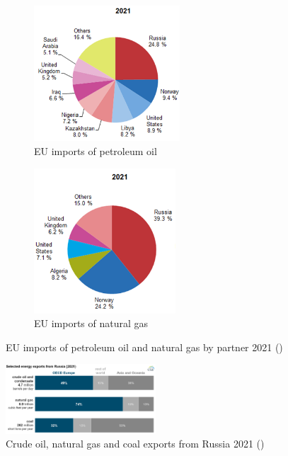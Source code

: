 \documentclass[12pt]{article}
\begin{document}
\begin{figure}[h]
     \centering
     \begin{subfigure}[b]{0.45\textwidth}
         \centering
         \includegraphics[width=0.60\textwidth]{images/eu oil import 21.png}
         \caption{EU imports of petroleum oil}
         \label{fig:eu oil import 21}
     \end{subfigure}
     \hfill
     \begin{subfigure}[b]{0.45\textwidth}
         \centering
         \includegraphics[width=0.58\textwidth]{images/eu nat gas import 21.png}
         \caption{EU imports of natural gas}
         \label{fig:eu nat gas import 21}
     \end{subfigure}
     \hfill
        \caption{EU imports of petroleum oil and natural gas by partner 2021 (\citeauthor{eurostat_2022})}
        \label{fig:eu 21 flows}
\end{figure}

\begin{figure}[h]
    \centering
    \includegraphics[width=0.5\textwidth]{images/rus exp 2021.png}
    \caption{Crude oil, natural gas and coal exports from Russia 2021 (\citeauthor{eia_2022})}
    \label{fig:rus exp 2021}
\end{figure}
\end{document}
